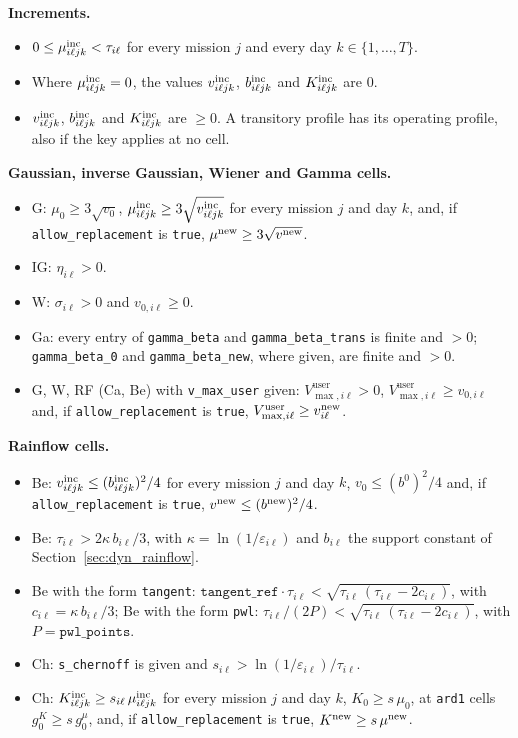 \textbf{Increments.}
\begin{itemize}[leftmargin=1.5em]
  \item $0 \le \mu^{\mathrm{inc}}_{i\ell jk} < \tau_{i\ell}$ for every mission $j$ and every day $k \in \{1,\ldots,T\}$.
  \item Where $\mu^{\mathrm{inc}}_{i\ell jk} = 0$, the values $v^{\mathrm{inc}}_{i\ell jk}$, $b^{\mathrm{inc}}_{i\ell jk}$ and $K^{\mathrm{inc}}_{i\ell jk}$ are $0$.
  \item $v^{\mathrm{inc}}_{i\ell jk}$, $b^{\mathrm{inc}}_{i\ell jk}$ and $K^{\mathrm{inc}}_{i\ell jk}$ are $\ge 0$. A transitory profile has its operating profile, also if the key applies at no cell.
\end{itemize}

\textbf{Gaussian, inverse Gaussian, Wiener and Gamma cells.}
\begin{itemize}[leftmargin=1.5em]
  \item G: $\mu_0 \ge 3\sqrt{v_0}$, $\mu^{\mathrm{inc}}_{i\ell jk} \ge 3\sqrt{v^{\mathrm{inc}}_{i\ell jk}}$ for every mission $j$ and day $k$, and, if \texttt{allow\_replacement} is \texttt{true}, $\mu^{\mathrm{new}} \ge 3\sqrt{v^{\mathrm{new}}}$.
  \item IG: $\eta_{i\ell} > 0$.
  \item W: $\sigma_{i\ell} > 0$ and $v_{0,i\ell} \ge 0$.
  \item Ga: every entry of \texttt{gamma\_beta} and \texttt{gamma\_beta\_trans} is finite and $> 0$; \texttt{gamma\_beta\_0} and \texttt{gamma\_beta\_new}, where given, are finite and $> 0$.
  \item G, W, RF (Ca, Be) with \texttt{v\_max\_user} given: $V^{\mathrm{user}}_{\max,i\ell} > 0$, $V^{\mathrm{user}}_{\max,i\ell} \ge v_{0,i\ell}$ and, if \texttt{allow\_replacement} is \texttt{true}, $V^{\mathrm{user}}_{\max,i\ell} \ge v^{\mathrm{new}}_{i\ell}$.
\end{itemize}

\textbf{Rainflow cells.}
\begin{itemize}[leftmargin=1.5em]
  \item Be: $v^{\mathrm{inc}}_{i\ell jk} \le (b^{\mathrm{inc}}_{i\ell jk})^2/4$ for every mission $j$ and day $k$, $v_{0} \le (b^{0})^2/4$ and, if \texttt{allow\_replacement} is \texttt{true}, $v^{\mathrm{new}} \le (b^{\mathrm{new}})^2/4$.
  \item Be: $\tau_{i\ell} > 2\kappa\, b_{i\ell}/3$, with $\kappa = \ln(1/\varepsilon_{i\ell})$ and $b_{i\ell}$ the support constant of Section~\ref{sec:dyn_rainflow}.
  \item Be with the form \texttt{tangent}: $\texttt{tangent\_ref}\cdot\tau_{i\ell} < \sqrt{\tau_{i\ell}\,(\tau_{i\ell} - 2c_{i\ell})}$, with $c_{i\ell} = \kappa\, b_{i\ell}/3$; Be with the form \texttt{pwl}: $\tau_{i\ell}/(2P) < \sqrt{\tau_{i\ell}\,(\tau_{i\ell} - 2c_{i\ell})}$, with $P = \texttt{pwl\_points}$.
  \item Ch: \texttt{s\_chernoff} is given and $s_{i\ell} > \ln(1/\varepsilon_{i\ell})/\tau_{i\ell}$.
  \item Ch: $K^{\mathrm{inc}}_{i\ell jk} \ge s_{i\ell}\,\mu^{\mathrm{inc}}_{i\ell jk}$ for every mission $j$ and day $k$, $K_{0} \ge s\,\mu_{0}$, at \texttt{ard1} cells $g^{K}_{0} \ge s\,g^{\mu}_{0}$, and, if \texttt{allow\_replacement} is \texttt{true}, $K^{\mathrm{new}} \ge s\,\mu^{\mathrm{new}}$.
\end{itemize}

